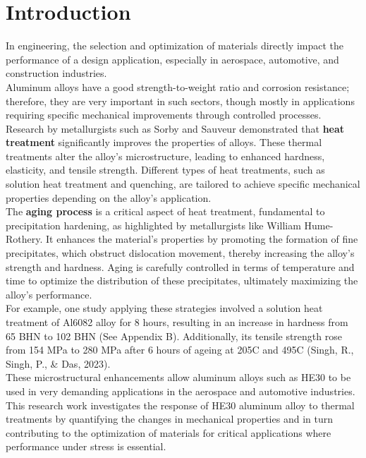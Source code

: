 \documentclass{article}
\begin{document}
    \newpage\vspace*{-5pt}
    \section{Introduction}

        In engineering, the selection and optimization of materials directly impact the performance of a design application, especially in aerospace, automotive, and construction industries. \\[8pt]
        \noindent
        Aluminum alloys have a good strength-to-weight ratio and corrosion resistance; therefore, they are very important in such sectors, though mostly in applications requiring specific mechanical improvements through controlled processes. \\[8pt]
        \noindent
        Research by metallurgists such as Sorby and Sauveur demonstrated that \textbf{heat treatment} significantly improves the properties of alloys. These thermal treatments alter the alloy's microstructure, leading to enhanced hardness, elasticity, and tensile strength. Different types of heat treatments, such as solution heat treatment and quenching, are tailored to achieve specific mechanical properties depending on the alloy’s application.\\[8pt]
        \noindent
        The \textbf{aging process} is a critical aspect of heat treatment, fundamental to precipitation hardening, as highlighted by metallurgists like William Hume-Rothery. It enhances the material's properties by promoting the formation of fine precipitates, which obstruct dislocation movement, thereby increasing the alloy's strength and hardness. Aging is carefully controlled in terms of temperature and time to optimize the distribution of these precipitates, ultimately maximizing the alloy’s performance.\\[8pt]
        \noindent
        For example, one study applying these strategies involved a solution heat treatment of Al6082 alloy for 8 hours, resulting in an increase in hardness from 65 BHN to 102 BHN (See Appendix B). Additionally, its tensile strength rose from 154 MPa to 280 MPa after 6 hours of ageing at 205\textdegree C and 495\textdegree C (Singh, R., Singh, P., \& Das, 2023).\\[8pt]
        \noindent
        These microstructural enhancements allow aluminum alloys such as HE30 to be used in very demanding applications in the aerospace and automotive industries.\\[8pt]
        \noindent
        This research work investigates the response of HE30 aluminum alloy to thermal treatments by quantifying the changes in mechanical properties and in turn contributing to the optimization of materials for critical applications where performance under stress is essential. 
    
\end{document}
